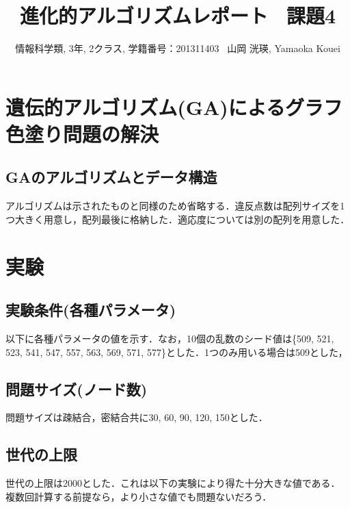 \documentclass[a4j]{jarticle}
\title{進化的アルゴリズムレポート \ 課題4}
\author{情報科学類, 3年, 2クラス, 学籍番号：201311403 \ 山岡 洸瑛, Yamaoka
Kouei}
\date{}
\begin{document}
\maketitle
\section*{遺伝的アルゴリズム(GA)によるグラフ色塗り問題の解決}

\subsection*{GAのアルゴリズムとデータ構造}
アルゴリズムは示されたものと同様のため省略する．違反点数は配列サイズを1
つ大きく用意し，配列最後に格納した．適応度については別の配列を用意した．

\section*{実験}
\subsection*{実験条件(各種パラメータ)}
以下に各種パラメータの値を示す．なお，10個の乱数のシード値は\{509, 521, 523, 541,
547, 557, 563, 569, 571, 577\}とした．1つのみ用いる場合は509とした，

\subsection*{問題サイズ(ノード数)}
問題サイズは疎結合，密結合共に30, 60, 90, 120, 150とした．

\subsection*{世代の上限}
世代の上限は2000とした．これは以下の実験により得た十分大きな値である．
複数回計算する前提なら，より小さな値でも問題ないだろう．
\end{document}
